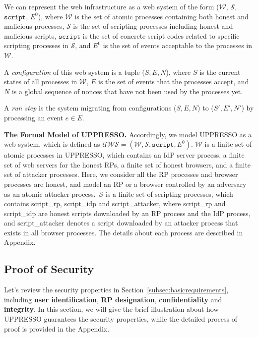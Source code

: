  We can represent the web infrastructure as a web system of the form ($\mathcal{W}$, $\mathcal{S}$, $\mathtt{script}$, $E^0$), where $\mathcal{W}$ is the set of atomic processes containing both honest and malicious processes, $\mathcal{S}$ is the set of scripting processes including honest and malicious scripts, $\mathtt{script}$ is the set of concrete script codes related to specific scripting processes in $\mathcal{S}$, and $E^0$ is the set of events acceptable to the processes in $\mathcal{W}$.

\noindent A {\em configuration} of this web system is a tuple ($S, E, N$), where $S$ is the current states of all processes in $\mathcal{W}$, $E$ is the set of events that the processes accept, and $N$ is a global sequence of nonces that have not been used by the processes yet.

\noindent A {\em run step} is the system migrating from configurations ($S, E, N$) to ($S', E', N'$) by processing an event $e \in E$.

\noindent\textbf{The Formal Model of UPPRESSO.}
Accordingly, we model UPPRESSO as a web system, which is defined as $\mathcal{UWS} = (\mathcal{W}, \mathcal{S}, \mathtt{script}, E^0)$. $\mathcal{W}$ is a finite set of atomic processes in UPPRESSO, which contains an IdP server process, a finite set of web servers for the honest RPs, a finite set of honest browsers, and a finite set of attacker processes. Here, we consider all the RP processes and browser processes are honest, and model an RP or a browser controlled by an adversary as an atomic attacker process.\
$\mathcal{S}$ is a finite set of scripting processes, which contains {\sf script\_rp}, {\sf script\_idp} and {\sf script\_attacker}, where {\sf script\_rp} and {\sf script\_idp} are honest scripts downloaded by an RP process and the IdP process, and {\sf script\_attacker} denotes a script downloaded by an attacker process that exists in all browser processes.
The details about each process are described in Appendix.


\subsection{Proof of Security}
Let's review the security properties in Section~\ref{subsec:basicrequirements}, including \textbf{user identification}, \textbf{RP designation}, \textbf{confidentiality} and \textbf{integrity}. In this section, we will give the brief illustration about how UPPRESSO guarantees the security properties, while the detailed process of proof is provided in the Appendix.

